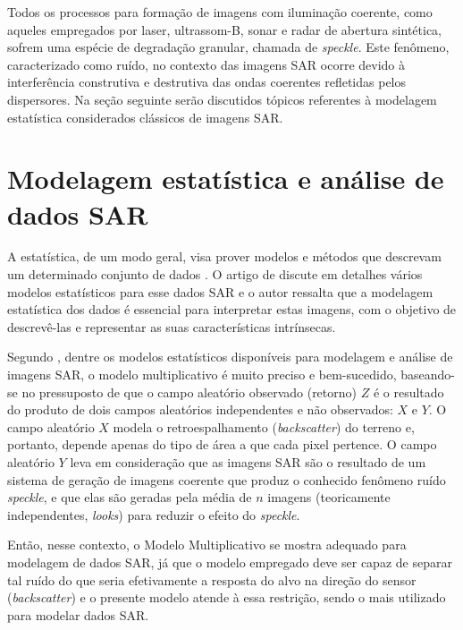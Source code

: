 Todos os processos para formação de imagens com iluminação coerente, como aqueles empregados por laser, ultrassom-B, sonar e radar de abertura sintética, sofrem uma espécie de degradação granular, chamada de \textit{speckle}. 
Este fenômeno, caracterizado como ruído, no contexto das imagens SAR ocorre devido à interferência construtiva e destrutiva das ondas coerentes refletidas pelos dispersores. 
Na seção seguinte serão discutidos tópicos referentes à modelagem estatística considerados clássicos de imagens SAR.


\section{Modelagem estatística e análise de dados SAR}

A estatística, de um modo geral, visa prover modelos e métodos que descrevam um determinado conjunto de dados \citep{dissert_torres}. 
O artigo de \citet{Gao2010StatisticalMO} discute em detalhes vários modelos estatísticos para esse dados SAR e o autor ressalta que a modelagem estatística dos dados é essencial para interpretar estas imagens, com o objetivo de descrevê-las e representar as suas características intrínsecas.

Segundo \citet{Mejail2002}, dentre os modelos estatísticos disponíveis para modelagem e análise de imagens SAR, o modelo multiplicativo é muito preciso e bem-sucedido, baseando-se no pressuposto de que o campo aleatório observado (retorno) $Z$ é o resultado do produto de dois campos aleatórios independentes e não observados: $X$ e $Y$. 
O campo aleatório $X$ modela o retroespalhamento (\textit{backscatter}) do terreno e, portanto, depende apenas do tipo de área a que cada pixel pertence. 
O campo aleatório $Y$ leva em consideração que as imagens SAR são o resultado de um sistema de geração de imagens coerente que produz o conhecido fenômeno ruído \textit{speckle}, e que elas são geradas pela média de $n$ imagens (teoricamente independentes, \textit{looks}) para reduzir o efeito do \textit{speckle}.

Então, nesse contexto, o Modelo Multiplicativo se mostra adequado para modelagem de dados SAR, já que o modelo empregado  deve ser capaz de separar tal ruído do que seria efetivamente a resposta do alvo na direção do sensor (\textit{backscatter}) e o presente modelo atende à essa restrição, sendo o mais utilizado para modelar dados SAR. 

